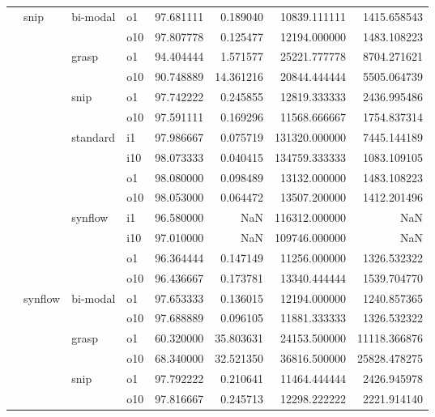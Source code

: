 \begin{longtable}{llllrrrr}
      & snip & bi-modal & o1 &  97.681111 &   0.189040 &     10839.111111 &   1415.658543 \\
      &     &         & o10 &  97.807778 &   0.125477 &     12194.000000 &   1483.108223 \\
      &     & grasp & o1 &  94.404444 &   1.571577 &     25221.777778 &   8704.271621 \\
      &     &         & o10 &  90.748889 &  14.361216 &     20844.444444 &   5505.064739 \\
      &     & snip & o1 &  97.742222 &   0.245855 &     12819.333333 &   2436.995486 \\
      &     &         & o10 &  97.591111 &   0.169296 &     11568.666667 &   1754.837314 \\
      &     & standard & i1 &  97.986667 &   0.075719 &    131320.000000 &   7445.144189 \\
      &     &         & i10 &  98.073333 &   0.040415 &    134759.333333 &   1083.109105 \\
      &     &         & o1 &  98.080000 &   0.098489 &     13132.000000 &   1483.108223 \\
      &     &         & o10 &  98.053000 &   0.064472 &     13507.200000 &   1412.201496 \\
      &     & synflow & i1 &  96.580000 &        NaN &    116312.000000 &           NaN \\
      &     &         & i10 &  97.010000 &        NaN &    109746.000000 &           NaN \\
      &     &         & o1 &  96.364444 &   0.147149 &     11256.000000 &   1326.532322 \\
      &     &         & o10 &  96.436667 &   0.173781 &     13340.444444 &   1539.704770 \\
      & synflow & bi-modal & o1 &  97.653333 &   0.136015 &     12194.000000 &   1240.857365 \\
      &     &         & o10 &  97.688889 &   0.096105 &     11881.333333 &   1326.532322 \\
      &     & grasp & o1 &  60.320000 &  35.803631 &     24153.500000 &  11118.366876 \\
      &     &         & o10 &  68.340000 &  32.521350 &     36816.500000 &  25828.478275 \\
      &     & snip & o1 &  97.792222 &   0.210641 &     11464.444444 &   2426.945978 \\
      &     &         & o10 &  97.816667 &   0.245713 &     12298.222222 &   2221.914140 \\

\end{longtable}
